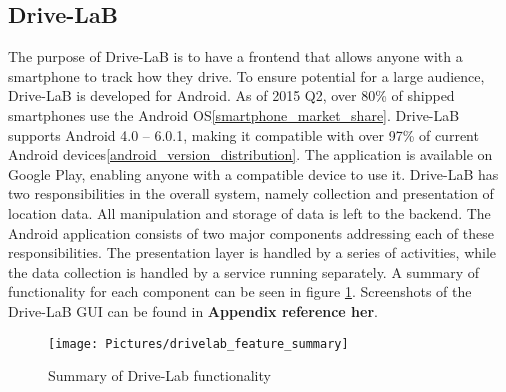 \subsection{Drive-LaB}\label{subsec:drivelab}
The purpose of Drive-LaB is to have a frontend that allows anyone with a smartphone to track how they drive. To ensure potential for a large audience, Drive-LaB is developed for Android. As of 2015 Q2, over 80\% of shipped smartphones use the Android OS\ref{smartphone_market_share}. Drive-LaB supports Android 4.0 – 6.0.1, making it compatible with over 97\% of current Android devices\ref{android_version_distribution}. The application is available on Google Play, enabling anyone with a compatible device to use it.
Drive-LaB has two responsibilities in the overall system, namely collection and presentation of location data. All manipulation and storage of data is left to the backend. The Android application consists of two major components addressing each of these responsibilities. The presentation layer is handled by a series of activities, while the data collection is handled by a service running separately. A summary of functionality for each component can be seen in figure \ref{fig:drivelab_feature_summary}. Screenshots of the Drive-LaB GUI can be found in \textbf{Appendix reference her}.

\begin{figure}[tb]
\centering
\texttt{[image: Pictures/drivelab\_feature\_summary]}
\caption{Summary of Drive-Lab functionality}
\label{fig:drivelab_feature_summary}
\end{figure}

